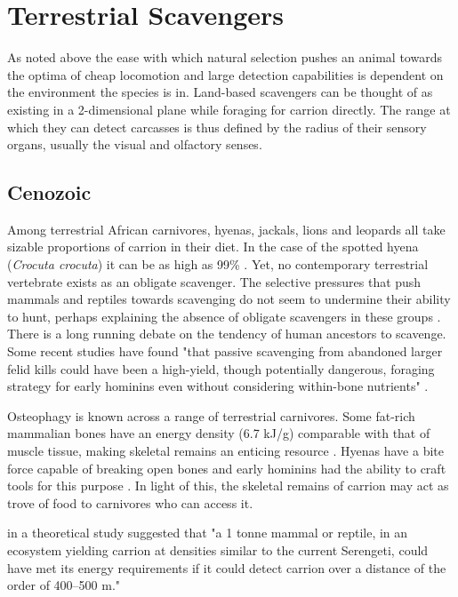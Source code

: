 \documentclass[a4paper,12pt]{article}
\begin{document}
\section{Terrestrial Scavengers}
As noted above the ease with which natural selection pushes an animal towards the optima of cheap locomotion and large detection capabilities is dependent on the environment the species is in. 
Land-based scavengers can be thought of as existing in a 2-dimensional plane while foraging for carrion directly. 
The range at which they can detect carcasses is thus defined by the radius of their sensory organs, usually the visual and olfactory senses. 

\subsection*{Cenozoic}
Among terrestrial African carnivores, hyenas, jackals, lions and leopards all take sizable proportions of carrion in their diet.
In the case of the spotted hyena (\textit{Crocuta crocuta}) it can be as high as 99\% \citep{benbow2015introduction}. 
Yet, no contemporary terrestrial vertebrate exists as an obligate scavenger. 
The selective pressures that push mammals and reptiles towards scavenging do not seem to undermine their ability to hunt, perhaps explaining the absence of obligate scavengers in these groups \citep{ruxton2004obligate}.
\\There is a long running debate on the tendency of human ancestors to scavenge. 
Some recent studies have found "that passive scavenging from abandoned larger felid kills could have been a high-yield, though potentially dangerous, foraging strategy for early hominins even without considering within-bone nutrients" \citep{pobiner2015new}. 

Osteophagy is known across a range of terrestrial carnivores.
Some fat-rich mammalian bones have an energy density (6.7 kJ/g) comparable with that of muscle tissue, making skeletal remains an enticing resource \citep{brown1989study}. 
Hyenas have a bite force capable of breaking open bones and early hominins had the ability to craft tools for this purpose \citep{hone2010feeding,ARCM:ARCM12084}. 
In light of this, the skeletal remains of carrion may act as trove of food to carnivores who can access it.  

\cite{ruxton2004obligate} in a theoretical study suggested that "a 1 tonne mammal or reptile, in an ecosystem yielding carrion at densities similar to the current Serengeti, could have met its energy requirements if it could detect carrion over a distance of the order of 400–500 m."
\end{document}
